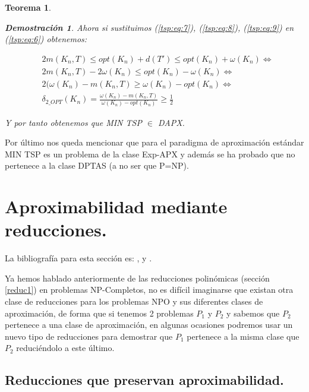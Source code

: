 \documentclass[a4paper,12pt,titlepage]{article}
\newtheorem{teo}{Teorema}[section]
\newtheorem*{dem}{\textbf{Demostraci\'on}}
\begin{document}
\begin{teo}
\begin{dem}
Ahora si sustituimos (\ref{tsp:eq:7}), (\ref{tsp:eq:8}), (\ref{tsp:eq:9}) en (\ref{tsp:eq:6}) obtenemos:

\begin{equation} \label{tsp:eq:10}
\begin{split}
& 2m(K_n,T) \leq opt(K_n) + d(T') \leq opt(K_n) + \omega(K_n) \Leftrightarrow \\ & 2m(K_n,T) - 2\omega(K_n) \leq opt(K_n) - \omega(K_n) \Leftrightarrow \\ & 2(\omega(K_n) - m(K_n,T) \geq \omega(K_n) - opt(K_n) \Leftrightarrow \\ & \delta_{2\_OPT}(K_n) = \frac{\omega(K_n) - m(K_n,T)}{\omega(K_n) - opt(K_n)} \geq \frac{1}{2}
\end{split}
\end{equation}

Y por tanto obtenemos que MIN TSP $\in$ DAPX.

\end{dem}
\end{teo}

Por \'ultimo nos queda mencionar que para el paradigma de aproximaci\'on est\'andar MIN TSP es un problema de la clase Exp-APX \cite{approx_core} y adem\'as se ha probado que no pertenece a la clase DPTAS (a no ser que P=NP)\cite{TSP2}.

\newpage

\section{Aproximabilidad mediante reducciones.}

La bibliograf\'ia para esta secci\'on es: \cite{approx_core}, \cite{red1} y \cite{red2}.

\vspace{0.3cm}

Ya hemos hablado anteriormente de las reducciones polin\'omicas (secci\'on \ref{reduc1}) en problemas NP-Completos, no es dif\'icil imaginarse que existan otra clase de reducciones para los problemas NPO y sus diferentes clases de aproximaci\'on, de forma que si tenemos 2 problemas $P_1$ y $P_2$ y sabemos que $P_2$ pertenece a una clase de aproximaci\'on, en algunas ocasiones podremos usar un nuevo tipo de reducciones para demostrar que $P_1$ pertenece a la misma clase que $P_2$ reduci\'endolo a este \'ultimo.

\subsection{Reducciones que preservan aproximabilidad.}
\end{document}
